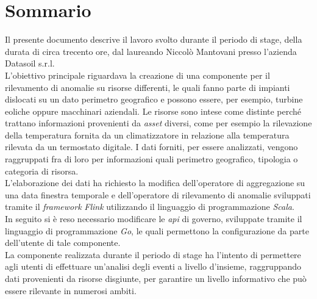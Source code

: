 
\cleardoublepage
{}
{}
\begingroup
\let\clearpage\relax
\let\cleardoublepage\relax
\let\cleardoublepage\relax

\chapter*{Sommario}

Il presente documento descrive il lavoro svolto durante il periodo di stage, della durata di circa trecento ore, dal laureando Niccolò Mantovani presso l'azienda Datasoil s.r.l.\\
L'obiettivo principale riguardava la creazione di una componente per il rilevamento di anomalie su risorse differenti, le quali fanno parte di impianti dislocati su un dato perimetro geografico e possono essere, per esempio, turbine eoliche oppure macchinari aziendali. Le risorse sono intese come distinte perché trattano informazioni provenienti da \textit{asset} diversi, come per esempio la rilevazione della temperatura fornita da un climatizzatore in relazione alla temperatura rilevata da un termostato digitale. I dati forniti, per essere analizzati, vengono raggruppati fra di loro per informazioni quali perimetro geografico, tipologia o categoria di risorsa.\\
L'elaborazione dei dati ha richiesto la modifica dell'operatore di aggregazione su una data finestra temporale e dell'operatore di rilevamento di anomalie sviluppati tramite il \textit{\textit{\gls{framework}}} \textit{Flink} utilizzando il linguaggio di programmazione \textit{Scala}.\\
In seguito si è reso necessario modificare le \textit{\gls{api}} di governo, sviluppate tramite il linguaggio di programmazione \textit{Go}, le quali permettono la configurazione da parte dell'utente di tale componente.\\
La componente realizzata durante il periodo di stage ha l'intento di permettere agli utenti di effettuare un'analisi degli eventi a livello d'insieme, raggruppando dati provenienti da risorse disgiunte, per garantire un livello informativo che può essere rilevante in numerosi ambiti.

%
%

\endgroup			

\vfill

